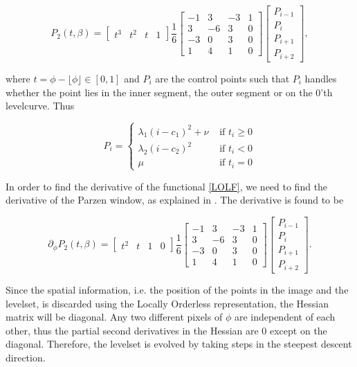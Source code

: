 \begin{equation}
  P_2(t,\beta) = 
  \begin{bmatrix} t^3 & t^2 & t & 1 \end{bmatrix} 
  \frac{1}{6} 
  \begin{bmatrix}
    -1 &  3 & -3 & 1 \\
    3 & -6 &  3 & 0 \\
    -3 &  0 &  3 & 0 \\
    1 &  4 &  1 & 0 
  \end{bmatrix}
  \left[\begin{array}{l} 
      P_{i-1} \\
      P_{i} \\
      P_{i+1} \\
      P_{i+2}
    \end{array}\right],
\end{equation}

where $t = \phi-\lfloor \phi\rfloor \in [0,1]$ and $P_i$ are the control points such that $P_i$ handles whether the point lies in the inner segment, the outer segment or on the 0'th levelcurve. Thus

\begin{equation}
  P_i = 
  \begin{cases}
    \lambda_1(i-c_1)^2 + \nu & \mbox{ if } t_i \geq 0\\
    \lambda_2(i-c_2)^2 & \mbox{ if } t_i < 0\\
    \mu & \mbox{ if } t_i = 0
  \end{cases}
\end{equation}

In order to find the derivative of the functional \eqref{LOLF}, we need to find the derivative of the Parzen window, as explained in . The derivative is found to be

\begin{equation}
\partial_\phi  P_2(t,\beta) = 
  \begin{bmatrix} t^2 & t & 1 & 0 \end{bmatrix} 
  \frac{1}{6} 
  \begin{bmatrix}
    -1 &  3 & -3 & 1 \\
    3 & -6 &  3 & 0 \\
    -3 &  0 &  3 & 0 \\
    1 &  4 &  1 & 0 
  \end{bmatrix}
  \left[\begin{array}{l} 
      P_{i-1} \\
      P_{i} \\
      P_{i+1} \\
      P_{i+2}
    \end{array}\right].
\end{equation}

Since the spatial information, i.e. the position of the points in the image and the levelset, is discarded using the Locally Orderless representation, the Hessian matrix will be diagonal. Any two different pixels of $\phi$ are independent of each other, thus the partial second derivatives in the Hessian are 0 except on the diagonal. Therefore, the levelset is evolved by taking steps in the steepest descent direction.